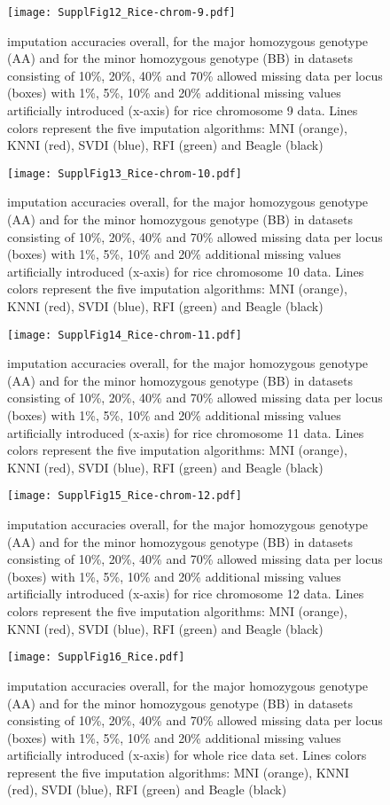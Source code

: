 \begin{figure}\texttt{[image: SupplFig12\_Rice-chrom-9.pdf]}\caption{
imputation accuracies overall, for the major homozygous genotype (AA) and for the minor homozygous genotype (BB) in datasets consisting of
10\%, 20\%, 40\% and 70\% allowed missing data per locus (boxes) with 1\%, 5\%, 10\% and 20\%
additional missing values artificially introduced (x-axis) for rice chromosome 9 data.
Lines colors represent the five imputation algorithms: MNI
(orange), KNNI (red), SVDI (blue), RFI (green) and Beagle (black)}\end{figure}
\begin{figure}\texttt{[image: SupplFig13\_Rice-chrom-10.pdf]}\caption{
imputation accuracies overall, for the major homozygous genotype (AA) and for the minor homozygous genotype (BB) in datasets consisting of
10\%, 20\%, 40\% and 70\% allowed missing data per locus (boxes) with 1\%, 5\%, 10\% and 20\%
additional missing values artificially introduced (x-axis) for rice chromosome 10 data.
Lines colors represent the five imputation algorithms: MNI
(orange), KNNI (red), SVDI (blue), RFI (green) and Beagle (black)}\end{figure}
\begin{figure}\texttt{[image: SupplFig14\_Rice-chrom-11.pdf]}\caption{
imputation accuracies overall, for the major homozygous genotype (AA) and for the minor homozygous genotype (BB) in datasets consisting of
10\%, 20\%, 40\% and 70\% allowed missing data per locus (boxes) with 1\%, 5\%, 10\% and 20\%
additional missing values artificially introduced (x-axis) for rice chromosome 11 data.
Lines colors represent the five imputation algorithms: MNI
(orange), KNNI (red), SVDI (blue), RFI (green) and Beagle (black)}\end{figure}
\begin{figure}\texttt{[image: SupplFig15\_Rice-chrom-12.pdf]}\caption{
imputation accuracies overall, for the major homozygous genotype (AA) and for the minor homozygous genotype (BB) in datasets consisting of
10\%, 20\%, 40\% and 70\% allowed missing data per locus (boxes) with 1\%, 5\%, 10\% and 20\%
additional missing values artificially introduced (x-axis) for rice chromosome 12 data.
Lines colors represent the five imputation algorithms: MNI
(orange), KNNI (red), SVDI (blue), RFI (green) and Beagle (black)}\end{figure}
\begin{figure}\texttt{[image: SupplFig16\_Rice.pdf]}\caption{
imputation accuracies overall, for the major homozygous genotype (AA) and for the minor homozygous genotype (BB) in datasets consisting of
10\%, 20\%, 40\% and 70\% allowed missing data per locus (boxes) with 1\%, 5\%, 10\% and 20\%
additional missing values artificially introduced (x-axis) for whole rice data set.
Lines colors represent the five imputation algorithms: MNI
(orange), KNNI (red), SVDI (blue), RFI (green) and Beagle (black)}\end{figure}













 




